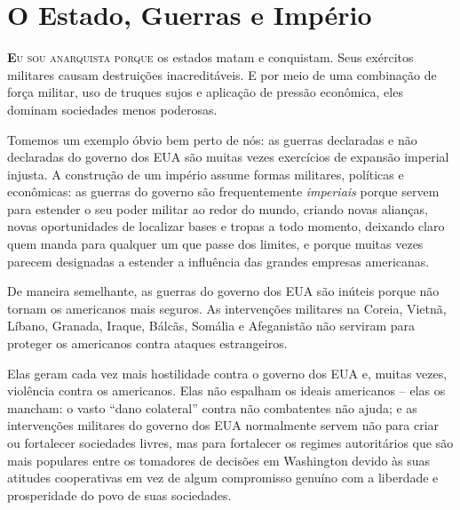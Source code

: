 
\chapter{O Estado, Guerras e Império}
\label{chap:4}

\lettrine[lines=2]{\textcolor{LettrineColor}{\textbf{E}}}{u sou anarquista porque} os estados matam e conquistam. Seus exércitos militares causam destruições inacreditáveis. E por meio de uma combinação de força militar, uso de truques sujos e aplicação de pressão econômica, eles dominam sociedades menos poderosas.

Tomemos um exemplo óbvio bem perto de nós: as guerras declaradas e não declaradas do governo dos EUA são muitas vezes exercícios de expansão imperial injusta. A construção de um império assume formas militares, políticas e econômicas: as guerras do governo são frequentemente \emph{imperiais} porque servem para estender o seu poder militar ao redor do mundo, criando novas alianças, novas oportunidades de localizar bases e tropas a todo momento, deixando claro quem manda para qualquer um que passe dos limites, e porque muitas vezes parecem designadas a estender a influência das grandes empresas americanas.

De maneira semelhante, as guerras do governo dos EUA são inúteis porque não tornam os americanos mais seguros. As intervenções militares na Coreia, Vietnã, Líbano, Granada, Iraque, Bálcãs, Somália e Afeganistão não serviram para proteger os americanos contra ataques estrangeiros.

Elas geram cada vez mais hostilidade contra o governo dos EUA e, muitas vezes, violência contra os americanos. Elas não espalham os ideais americanos -- elas os mancham: o vasto ``dano colateral'' contra não combatentes não ajuda; e as intervenções militares do governo dos EUA normalmente servem não para criar ou fortalecer sociedades livres, mas para fortalecer os regimes autoritários que são mais populares entre os tomadores de decisões em Washington devido às suas atitudes cooperativas em vez de algum compromisso genuíno com a liberdade e prosperidade do povo de suas sociedades.


